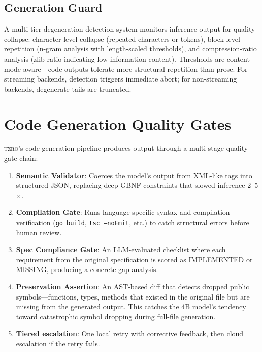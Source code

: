 \documentclass{article}
\begin{document}
\subsection{Generation Guard}

A multi-tier degeneration detection system monitors inference output for quality collapse:
character-level collapse (repeated characters or tokens),
block-level repetition (n-gram analysis with length-scaled thresholds),
and compression-ratio analysis (zlib ratio indicating low-information content).
Thresholds are content-mode-aware---code outputs tolerate more structural repetition than prose.
For streaming backends, detection triggers immediate abort; for non-streaming backends, degenerate tails are truncated.

\section{Code Generation Quality Gates}
\label{sec:codegen_quality}

\textsc{tzro}'s code generation pipeline produces output through a multi-stage quality gate chain:

\begin{enumerate}[leftmargin=*]
\item \textbf{Semantic Validator}: Coerces the model's output from XML-like tags into structured JSON, replacing deep GBNF constraints that slowed inference 2--5$\times$.
\item \textbf{Compilation Gate}: Runs language-specific syntax and compilation verification (\texttt{go build}, \texttt{tsc --noEmit}, etc.) to catch structural errors before human review.
\item \textbf{Spec Compliance Gate}: An LLM-evaluated checklist where each requirement from the original specification is scored as IMPLEMENTED or MISSING, producing a concrete gap analysis.
\item \textbf{Preservation Assertion}: An AST-based diff that detects dropped public symbols---functions, types, methods that existed in the original file but are missing from the generated output. This catches the 4B model's tendency toward catastrophic symbol dropping during full-file generation.
\item \textbf{Tiered escalation}: One local retry with corrective feedback, then cloud escalation if the retry fails.
\end{enumerate}
\end{document}
